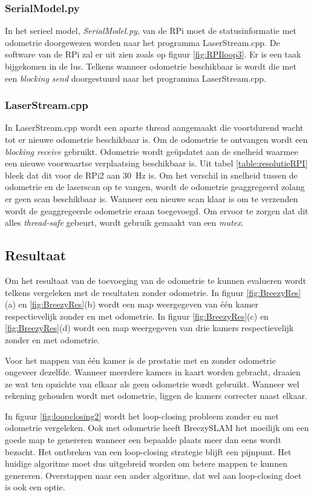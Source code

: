 \subsubsection{SerialModel.py}
In het serieel model, \textit{SerialModel.py}, van de RPi moet de statusinformatie met odometrie doorgewezen worden naar het programma LaserStream.cpp. De software van de RPi zal er uit zien zoals op figuur \ref{fig:RPIloop3}. Er is een taak bijgekomen in de lus. Telkens wanneer odometrie beschikbaar is wordt die met een \textit{blocking send} doorgestuurd naar het programma LaserStream.cpp.

\subsubsection{LaserStream.cpp}
In LaserStream.cpp wordt een aparte thread aangemaakt die voortdurend wacht tot er nieuwe odometrie beschikbaar is. Om de odometrie te ontvangen wordt een \textit{blocking receive} gebruikt. Odometrie wordt ge\"updatet aan de snelheid waarmee een nieuwe voorwaartse verplaatsing beschikbaar is. Uit tabel \ref{table:resolutieRPI} bleek dat dit voor de RPi2 aan \SI{30}{\Hz} is. Om het verschil in snelheid tussen de odometrie en de laserscan op te vangen, wordt de odometrie geaggregeerd zolang er geen scan beschikbaar is. Wanneer een nieuwe scan klaar is om te verzenden wordt de geaggregeerde odometrie eraan toegevoegd. Om ervoor te zorgen dat dit alles \textit{thread-safe} gebeurt, wordt gebruik gemaakt van een \textit{mutex}.

\subsection{Resultaat}
Om het resultaat van de toevoeging van de odometrie te kunnen evalueren wordt telkens vergeleken met de resultaten zonder odometrie. In figuur \ref{fig:BreezyRes}(a) en \ref{fig:BreezyRes}(b) wordt een map weergegeven van \'e\'en kamer respectievelijk zonder en met odometrie. In figuur \ref{fig:BreezyRes}(c) en \ref{fig:BreezyRes}(d) wordt een map weergegeven van drie kamers respectievelijk zonder en met odometrie.

\npar Voor het mappen van \'e\'en kamer is de prestatie met en zonder odometrie ongeveer dezelfde. Wanneer meerdere kamers in kaart worden gebracht, draaien ze wat ten opzichte van elkaar als geen odometrie wordt gebruikt. Wanneer wel rekening gehouden wordt met odometrie, liggen de kamers correcter naast elkaar.

\npar In figuur \ref{fig:loopclosing2} wordt het loop-closing probleem zonder en met odometrie vergeleken. Ook met odometrie heeft BreezySLAM het moeilijk om een goede map te genereren wanneer een bepaalde plaats meer dan eens wordt bezocht. Het ontbreken van een loop-closing strategie blijft een pijnpunt. Het huidige algoritme moet dus uitgebreid worden om betere mappen te kunnen genereren. Overstappen naar een ander algoritme, dat wel aan loop-closing doet is ook een optie.

